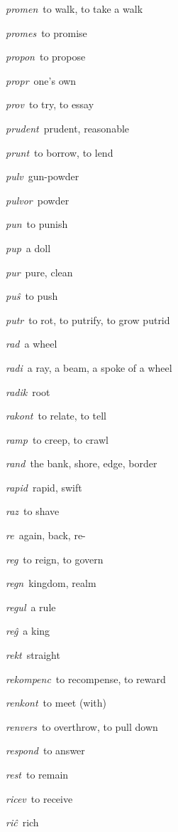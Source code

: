 \begin{landscape}
\begin{multicols}{5}
\begin{outdent}{1em}
\emph{promen\,} to walk, to take a walk

\emph{promes\,} to promise

\emph{propon\,} to propose

\emph{propr\,} one’s own

\emph{prov\,} to try, to essay

\emph{prudent\,} prudent, reasonable

\emph{prunt\,} to borrow, to lend

\emph{pulv\,} gun-powder

\emph{pulvor\,} powder

\emph{pun\,} to punish

\emph{pup\,} a doll

\emph{pur\,} pure, clean

\emph{puŝ\,} to push

\emph{putr\,} to rot, to putrify, to grow putrid
\end{outdent}


\begin{outdent}{1em}
\emph{rad\,} a wheel

\emph{radi\,} a ray, a beam, a spoke of a wheel

\emph{radik\,} root

\emph{rakont\,} to relate, to tell

\emph{ramp\,} to creep, to crawl

\emph{rand\,} the bank, shore, edge, border

\emph{rapid\,} rapid, swift

\emph{raz\,} to shave

\emph{re\,} again, back, re-

\emph{reg\,} to reign, to govern

\emph{regn\,} kingdom, realm

\emph{regul\,} a rule

\emph{reĝ\,} a king

\emph{rekt\,} straight

\emph{rekompenc\,} to recompense, to reward

\emph{renkont\,} to meet (with)

\emph{renvers\,} to overthrow, to pull down

\emph{respond\,} to answer

\emph{rest\,} to remain

\emph{ricev\,} to receive

\emph{riĉ\,} rich


\end{outdent}
\end{multicols}
\end{landscape}
